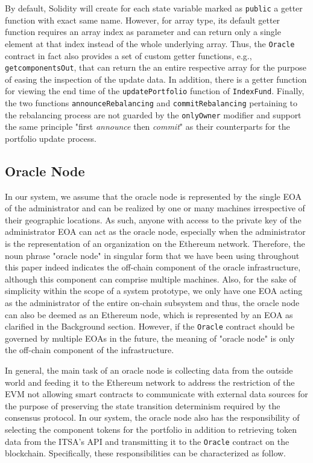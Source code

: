 By default, Solidity will create for each state variable marked as \texttt{public} a getter function with exact same name. However, for array type, its default getter function requires an array index as parameter and can return only a single element at that index instead of the whole underlying array. Thus, the \texttt{Oracle} contract in fact also provides a set of custom getter functions, e.g., \texttt{getcomponentsOut}, that can return the an entire respective array for the purpose of easing the inspection of the update data. In addition, there is a getter function for viewing the end time of the \texttt{updatePortfolio} function of \texttt{IndexFund}. Finally, the two functions \texttt{announceRebalancing} and \texttt{commitRebalancing} pertaining to the rebalancing process are not guarded by the \texttt{onlyOwner} modifier and support the same principle "first \textit{announce} then \textit{commit}" as their counterparts for the portfolio update process.

\subsection{Oracle Node} \label{subsec:oracle_node}

In our system, we assume that the oracle node is represented by the single EOA of the administrator and can be realized by one or many machines irrespective of their geographic locations. As such, anyone with access to the private key of the administrator EOA can act as the oracle node, especially when the administrator is the representation of an organization on the Ethereum network. Therefore, the noun phrase "oracle node" in singular form that we have been using throughout this paper indeed indicates the off-chain component of the oracle infrastructure, although this component can comprise multiple machines. Also, for the sake of simplicity within the scope of a system prototype, we only have one EOA acting as the administrator of the entire on-chain subsystem and thus, the oracle node can also be deemed as an Ethereum node, which is represented by an EOA as clarified in the Background section. However, if the \texttt{Oracle} contract should be governed by multiple EOAs in the future, the meaning of "oracle node" is only the off-chain component of the infrastructure.

In general, the main task of an oracle node is collecting data from the outside world and feeding it to the Ethereum network to address the restriction of the EVM not allowing smart contracts to communicate with external data sources for the purpose of preserving the  state transition determinism required by the consensus protocol. In our system, the oracle node also has the responsibility of selecting the component tokens for the portfolio in addition to retrieving token data from the ITSA's API and transmitting it to the \texttt{Oracle} contract on the blockchain. Specifically, these responsibilities can be characterized as follow.

